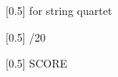 \documentclass[11pt]{report}
\begin{document}
\begin{titlepage}
        \vspace*{1\baselineskip}
\begin{center}
        {
            \scalebox{0.5}[0.5]
            {\fontsize{1.3cm}{1em}\selectfont for string quartet}
        }
\end{center}
        \vspace*{0.5\baselineskip}
\begin{center}
        {
            \scalebox{0.5}[0.5]
            {\fontsize{1cm}{1em}/20}
        }
\end{center}
        \vspace*{19\baselineskip}
\begin{center}
        {
            \scalebox{0.5}[0.5]
            {\fontsize{1cm}{1em}\selectfont SCORE}
        }
\end{center}

    \end{titlepage}
\end{document}
